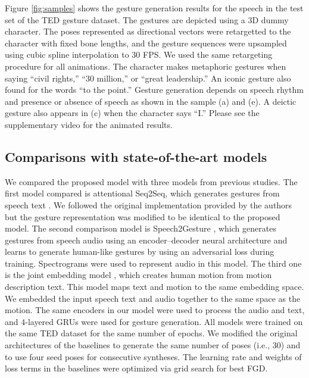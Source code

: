 \documentclass[acmtog]{acmart}
\begin{document}
Figure \ref{fig:samples} shows the gesture generation results for the speech in the test set of the TED gesture dataset. The gestures are depicted using a 3D dummy character. The poses represented as directional vectors were retargetted to the character with fixed bone lengths, and the gesture sequences were upsampled using cubic spline interpolation to 30 FPS. We used the same retargeting procedure for all animations. The character makes metaphoric gestures when saying ``civil rights,'' ``30 million,'' or ``great leadership.'' An iconic gesture also found for the words ``to the point.'' Gesture generation depends on speech rhythm and presence or absence of speech as shown in the sample (a) and (e). A deictic gesture also appears in (c) when the character says ``I.'' Please see the supplementary video for the animated results.

\subsection{Comparisons with state-of-the-art models} \label{sec:sota}

We compared the proposed model with three models from previous studies. The first model compared is attentional Seq2Seq, which generates gestures from speech text \cite{yoon2019robots}. We followed the original implementation provided by the authors but the gesture representation was modified to be identical to the proposed model. The second comparison model is Speech2Gesture \cite{ginosar2019gestures}, which generates gestures from speech audio using an encoder--decoder neural architecture and learns to generate human-like gestures by using an adversarial loss during training. Spectrograms were used to represent audio in this model. The third one is the joint embedding model \cite{ahuja2019language2pose}, which creates human motion from motion description text. This model maps text and motion to the same embedding space. We embedded the input speech text and audio together to the same space as the motion. The same encoders in our model were used to process the audio and text, and 4-layered GRUs were used for gesture generation. All models were trained on the same TED dataset for the same number of epochs. We modified the original architectures of the baselines to generate the same number of poses (i.e., 30) and to use four seed poses for consecutive syntheses. The learning rate and weights of loss terms in the baselines were optimized via grid search for best FGD. 
\end{document}
